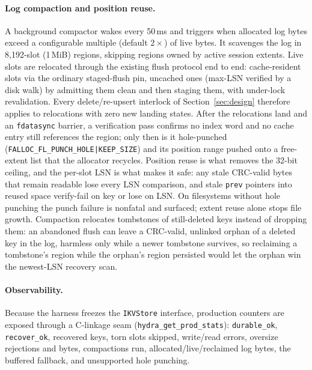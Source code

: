 \documentclass{article}
\begin{document}
\paragraph{Log compaction and position reuse.}
A background compactor wakes every 50\,ms and triggers when allocated log bytes exceed a configurable multiple (default $2\times$) of live bytes. It scavenges the log in 8{,}192-slot (1\,MiB) regions, skipping regions owned by active session extents. Live slots are relocated through the existing flush protocol end to end: cache-resident slots via the ordinary staged-flush pin, uncached ones (max-LSN verified by a disk walk) by admitting them clean and then staging them, with under-lock revalidation. Every delete/re-upsert interlock of Section~\ref{sec:design} therefore applies to relocations with zero new landing states. After the relocations land and an \texttt{fdatasync} barrier, a verification pass confirms no index word and no cache entry still references the region; only then is it hole-punched (\texttt{FALLOC\_FL\_PUNCH\_HOLE|KEEP\_SIZE}) and its position range pushed onto a free-extent list that the allocator recycles. Position reuse is what removes the 32-bit ceiling, and the per-slot LSN is what makes it safe: any stale CRC-valid bytes that remain readable lose every LSN comparison, and stale \texttt{prev} pointers into reused space verify-fail on key or lose on LSN. On filesystems without hole punching the punch failure is nonfatal and surfaced; extent reuse alone stops file growth. Compaction relocates tombstones of still-deleted keys instead of dropping them: an abandoned flush can leave a CRC-valid, unlinked orphan of a deleted key in the log, harmless only while a newer tombstone survives, so reclaiming a tombstone's region while the orphan's region persisted would let the orphan win the newest-LSN recovery scan.

\paragraph{Observability.}
Because the harness freezes the \texttt{IKVStore} interface, production counters are exposed through a C-linkage seam (\texttt{hydra\_get\_prod\_stats}): \texttt{durable\_ok}, \texttt{recover\_ok}, recovered keys, torn slots skipped, write/read errors, oversize rejections and bytes, compactions run, allocated/live/reclaimed log bytes, the buffered fallback, and unsupported hole punching.
\end{document}

